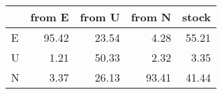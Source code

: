 \begin{tabular}{lrrrr}
\toprule
{} &  from E &  from U &  from N &  stock \\
\midrule
E &   95.42 &   23.54 &    4.28 &  55.21 \\
U &    1.21 &   50.33 &    2.32 &   3.35 \\
N &    3.37 &   26.13 &   93.41 &  41.44 \\
\bottomrule
\end{tabular}
